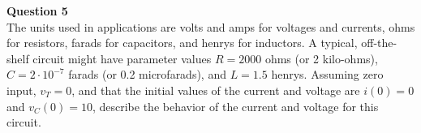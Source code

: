 \documentclass[preview]{standalone}
\begin{document}
\begin{center}
\raggedright
                    \textbf{Question 5}\\
                   The units used in applications are volts and amps for voltages and currents, ohms
                    for resistors, farads for capacitors, and henrys for inductors. A typical, off-the-shelf
                    circuit might have parameter values $R = 2000$ ohms (or 2 kilo-ohms), $C = 2 · 10^{−7}$
                    farads (or 0.2 microfarads), and $L = 1.5$ henrys. Assuming zero input, $v_T = 0$,
                    and that the initial values of the current and voltage are $i(0) = 0$ and $v_C(0) = 10$,
                    describe the behavior of the current and voltage for this circuit.
\end{center}
\end{document}
